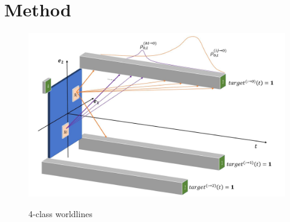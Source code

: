 \documentclass[11pt,a4paper]{article}
\begin{document}
\clearpage
\section{Method}

\begin{figure}
  {\includegraphics[width=1.0\linewidth]{fig/mnist_spacetime.jpg}}
  \caption[4-class worldlines]{4-class worldlines}\label{fig:mnist-spacetime}
\end{figure}
\end{document}
